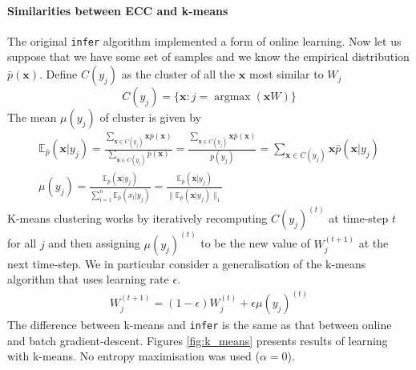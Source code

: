 \documentclass[12pt]{article}
\DeclareMathOperator*{\argmax}{argmax}
\begin{document}
\paragraph{Similarities between ECC and k-means }
The original \texttt{infer} algorithm implemented a form of online learning. Now let us suppose that we have some set of samples and we know the empirical distribution $\bar{p}(\boldsymbol{x})$. Define $C(y_j)$ as the cluster of all the $\boldsymbol{x}$ most similar to $W_j$ 
\[
C(y_j) = \{\boldsymbol{x} :  j = \argmax(\boldsymbol{x} W) \} 
\]
The mean $\mu(y_j)$ of cluster is given by 
\begin{gather*}
	\mathbb{E}_{\bar{p}}(\boldsymbol{x}|y_j) = \frac{\sum_{\boldsymbol{x}\in C(y_j)} \boldsymbol{x}\bar{p}(\boldsymbol{x})}{\sum_{\boldsymbol{x}\in C(y_j)} \bar{p}(\boldsymbol{x})} = \frac{\sum_{\boldsymbol{x}\in C(y_j)} \boldsymbol{x}\bar{p}(\boldsymbol{x})}{\bar{p}(y_j)} = \sum_{\boldsymbol{x}\in C(y_j)} \boldsymbol{x}\bar{p}(\boldsymbol{x}|y_j)\\
	\mu(y_j)  = \frac{\mathbb{E}_{\bar{p}}(\boldsymbol{x}|y_j)}{\sum_{ï=1}^{n}\mathbb{E}_{\bar{p}}(x_{ï}|y_j)}  = \frac{\mathbb{E}_{\bar{p}}(\boldsymbol{x}|y_j)}{\lVert \mathbb{E}_{\bar{p} }(\boldsymbol{x}|y_j)\rVert_1}
\end{gather*}
K-means clustering works by iteratively recomputing $C(y_j)^{(t)}$ at time-step $t$ for all $j$ and then assigning $\mu(y_j)^{(t)}$ to be the new value of $W_j^{(t+1)}$ at the next time-step. We in particular consider a generalisation of the k-means algorithm that uses learning rate $\epsilon$.
\begin{gather*}
W_j^{(t+1)} = (1-\epsilon)W_j^{(t)}+\epsilon \mu(y_j)^{(t)} 
\end{gather*} 
The difference between k-means and \texttt{infer} is the same as that between online and batch gradient-descent. Figures \ref{fig:k_means} presents results of learning with k-means. No entropy maximisation was used ($\alpha=0$).
\end{document}
